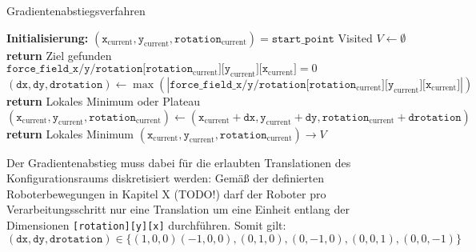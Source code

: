\begin{algorithm}
\caption{Gradientenabstiegsverfahren}
\begin{algorithmic}[1]
    \State \textbf{Initialisierung:}
    \State \hspace{\algorithmicindent} $(\texttt{x}_{\text{current}}, \texttt{y}_{\text{current}}, \texttt{rotation}_{\text{current}}) = \texttt{start\_point}$
    \State \hspace{\algorithmicindent} Visited $V \leftarrow \emptyset$
	\vspace*{0.3cm}
		\vspace*{0.1cm}
            \State \textbf{return} Ziel gefunden
        \EndIf
		\vspace*{0.1cm}
        \State $\texttt{force\_field\_x/y/rotation}\texttt{[}\texttt{rotation}_{\text{current}}\texttt{][}\texttt{y}_{\text{current}}\texttt{][}\texttt{x}_{\text{current}}\texttt{]} = 0$
        \State $(\texttt{dx}, \texttt{dy}, \texttt{drotation}) \gets \max(|\texttt{force\_field\_x/y/rotation}\texttt{[}\texttt{rotation}_{\text{current}}\texttt{][}\texttt{y}_{\text{current}}\texttt{][}\texttt{x}_{\text{current}}\texttt{]}|)$
		\vspace*{-0.3cm}
            \State \textbf{return} Lokales Minimum oder Plateau
        \EndIf
     	\vspace*{0.1cm}
        \State $(\texttt{x}_{\text{current}}, \texttt{y}_{\text{current}}, \texttt{rotation}_{\text{current}}) \gets (\texttt{x}_{\text{current}} + \texttt{dx}, \texttt{y}_{\text{current}} + \texttt{dy}, \texttt{rotation}_{\text{current}} + \texttt{drotation})$
		\vspace*{-0.3cm}
            \State \textbf{return} Lokales Minimum
		\Else
			\State $(\texttt{x}_{\text{current}}, \texttt{y}_{\text{current}}, \texttt{rotation}_{\text{current}}) \rightarrow V$
        \EndIf
		\vspace*{0.1cm}
    \EndWhile
\end{algorithmic}
\end{algorithm}

Der Gradientenabstieg muss dabei für die erlaubten Translationen des Konfigurationsraums diskretisiert werden: 
Gemäß der definierten Roboterbewegungen in Kapitel X (TODO!) darf der Roboter pro Verarbeitungsschritt nur eine Translation um eine Einheit entlang der Dimensionen \texttt{[rotation][y][x]} durchführen. Somit gilt:
\begin{equation*}
(\texttt{dx}, \texttt{dy}, \texttt{drotation}) \in \{(1,0,0)(-1,0,0),(0,1,0),(0,-1,0),(0,0,1),(0,0,-1)\}
\end{equation*}






